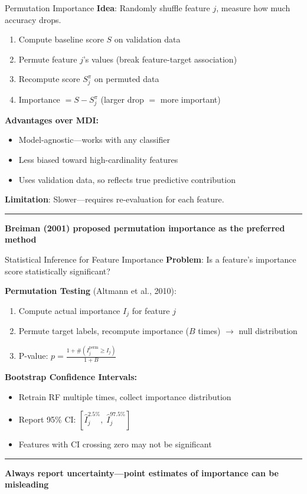 \documentclass[8pt,aspectratio=169]{beamer}
\newcommand{\bottomnote}[1]{%
\vfill
\vspace{-2mm}
\textcolor{mllavender2}{\rule{\textwidth}{0.4pt}}
\vspace{1mm}
\footnotesize
\textbf{#1}
}
\begin{document}
\begin{frame}[t]{Permutation Importance}
\textbf{Idea}: Randomly shuffle feature $j$, measure how much accuracy drops.
\begin{enumerate}
\item Compute baseline score $S$ on validation data
\item Permute feature $j$'s values (break feature-target association)
\item Recompute score $S_j^{\pi}$ on permuted data
\item Importance $= S - S_j^{\pi}$ (larger drop $=$ more important)
\end{enumerate}

\vspace{0.3em}
\textbf{Advantages over MDI:}
\begin{itemize}
\item Model-agnostic---works with any classifier
\item Less biased toward high-cardinality features
\item Uses validation data, so reflects true predictive contribution
\end{itemize}

\vspace{0.3em}
\textbf{Limitation}: Slower---requires re-evaluation for each feature.
\bottomnote{Breiman (2001) proposed permutation importance as the preferred method}
\end{frame}

\begin{frame}[t]{Statistical Inference for Feature Importance}
\textbf{Problem}: Is a feature's importance score statistically significant?

\vspace{0.3em}
\textbf{Permutation Testing} (Altmann et al., 2010):
\begin{enumerate}
\item Compute actual importance $I_j$ for feature $j$
\item Permute target labels, recompute importance ($B$ times) $\rightarrow$ null distribution
\item P-value: $p = \frac{1 + \#(I_j^{\text{perm}} \geq I_j)}{1 + B}$
\end{enumerate}

\vspace{0.3em}
\textbf{Bootstrap Confidence Intervals:}
\begin{itemize}
\item Retrain RF multiple times, collect importance distribution
\item Report 95\% CI: $[\hat{I}_j^{2.5\%},\; \hat{I}_j^{97.5\%}]$
\item Features with CI crossing zero may not be significant
\end{itemize}
\bottomnote{Always report uncertainty---point estimates of importance can be misleading}
\end{frame}
\end{document}
